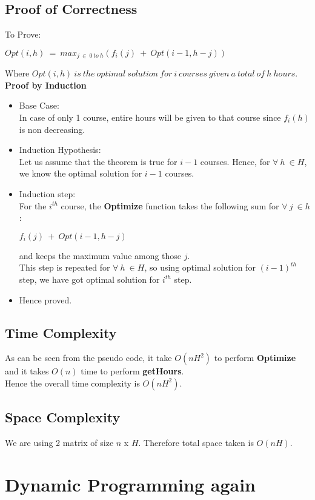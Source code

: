 \documentclass[pdftex,a4paper,12pt]{report}
\begin{document}
\subsection{Proof of Correctness}
To Prove:\\
\begin{center}
$Opt(i,h)\ =\ max_{j\ \in\ 0\ to\ h}(f_{i}(j)\ +\ Opt(i-1,h-j))$
\end{center}
Where $Opt(i,h)\ is\ the\ optimal\ solution\ for\ i\ courses\ given\ a\ total\ of\ h\ hours$.\\
\newpage
\textbf{Proof by Induction}\\
\begin{itemize}
\item Base Case:\\
In case of only 1 course, entire hours will be given to that course since $f_{i}(h)$ is non decreasing.
\item Induction Hypothesis:\\
Let us assume that the theorem is true for $i-1$ courses. Hence, for $\forall\ h\ \in H$, we know the optimal solution for $i-1$ courses.
\item Induction step:\\
For the $i^{th}$ course, the \textbf{Optimize} function takes the following sum for $\forall\ j\ \in h$:\\
\begin{center}
$f_{i}(j)\ +\ Opt(i-1,h-j)$
\end{center}
and keeps the maximum value among those $j$.\\
This step is repeated for $\forall\ h\ \in H$, so using optimal solution for $(i-1)^{th}$ step, we have got optimal solution for $i^{th}$ step.
\item Hence proved.
\end{itemize}
\subsection{Time Complexity}
As can be seen from the pseudo code, it take $O(nH^2)$ to perform \textbf{Optimize} and it takes $O(n)$ time to perform \textbf{getHours}.\\
Hence the overall time complexity is \textbf{$O(nH^2)$}.
\subsection{Space Complexity}
We are using 2 matrix of size $n$ x $H$. Therefore total space taken is $O(nH)$.
\section{Dynamic Programming again}
\end{document}

